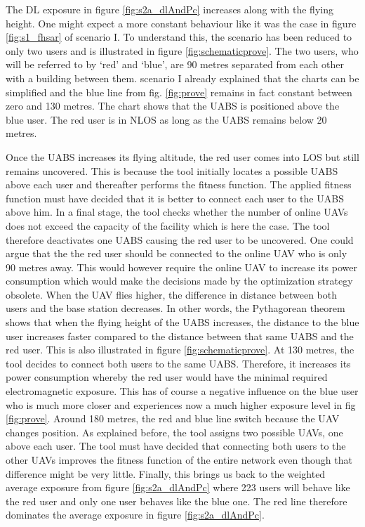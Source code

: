 The \gls{DL} exposure in figure \ref{fig:s2a_dlAndPc} increases along with the flying height. One might expect a more constant 
behaviour like it was the case in figure \ref{fig:s1_fhsar} of scenario I. To understand this, the scenario has been reduced  
to only two users and is illustrated in figure \ref{fig:schematicprove}.
The two users, who will be referred to by `red' and `blue', are 90 metres separated from each other with a building between them.
scenario I already explained that the charts can be simplified and the blue line from fig. \ref{fig:prove} remains in fact constant between zero and 130 metres.
The chart shows that the \gls{UABS} is positioned above the blue user. The red user is in \gls{NLOS} as long as the \gls{UABS} remains below 20 metres.

Once the \gls{UABS} increases its flying altitude, the red user comes into \gls{LOS} but still remains uncovered. This is because the tool initially locates a possible 
\gls{UABS} above each user and thereafter performs the  fitness function. The applied fitness function must have decided that it is better to connect 
each user to the \gls{UABS} above him. In a final stage, the tool checks whether the number of online \gls{UAV}s does not exceed the capacity of the facility
which is here the case. The tool therefore deactivates one \gls{UABS} causing the red user to be uncovered. One could argue that the 
the red user should be connected to the online \gls{UAV} who is only 90 metres away. This would however require the online \gls{UAV} to increase its power consumption which 
would make the decisions made by the optimization strategy obsolete.
When the \gls{UAV} flies higher, the difference in distance between both users and the base station decreases. In other words, the Pythagorean theorem shows that when the flying height of the 
\gls{UABS} increases, the distance to the blue user increases faster compared to the distance between that same \gls{UABS} and the red user. This is also illustrated in 
figure \ref{fig:schematicprove}.
At 130 metres, the tool decides to connect both users to the same \gls{UABS}. Therefore, it increases its power consumption whereby the red user would  have the minimal 
required electromagnetic exposure. This has of course a negative influence on the blue user who is much more closer and experiences now a much higher exposure level in fig \ref{fig:prove}.
Around 180 metres, the  red and blue line switch because the \gls{UAV} changes position. As explained before, the tool assigns two possible \gls{UAV}s, one above 
each user. The tool must have decided that connecting both users to the other \gls{UAV}s improves the fitness function of the entire network even though that difference might be 
very little.
Finally, this brings us back to the weighted average exposure from figure \ref{fig:s2a_dlAndPc} where 223 users will behave like the  red user and only
one user behaves like the blue one. 
The red line therefore dominates the average exposure in figure \ref{fig:s2a_dlAndPc}.

